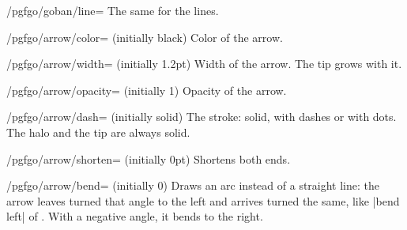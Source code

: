 \begin{key}{/pgfgo/goban/line=}
	The same for the lines.
\end{key}

\begin{key}{/pgfgo/arrow/color= (initially black)}
	Color of the arrow.
\end{key}

\begin{key}{/pgfgo/arrow/width= (initially 1.2pt)}
	Width of the arrow. The tip grows with it.
\end{key}

\begin{key}{/pgfgo/arrow/opacity= (initially 1)}
	Opacity of the arrow.

	\begin{codeexample}[]
		\begin{goban}[5]
		\end{goban}
	\end{codeexample}
\end{key}

\begin{key}{/pgfgo/arrow/dash= (initially solid)}
	The stroke: solid, with dashes or with dots. The halo and the tip are always solid.
\end{key}

\begin{key}{/pgfgo/arrow/shorten= (initially 0pt)}
	Shortens both ends.

	\begin{codeexample}[]
		\begin{goban}[5]
		\end{goban}
	\end{codeexample}
\end{key}

\begin{key}{/pgfgo/arrow/bend= (initially 0)}
	Draws an arc instead of a straight line: the arrow leaves turned that angle to the left and arrives turned the same, like |bend left| of \tikzname. With a negative angle, it bends to the right.

	\begin{codeexample}[]
		\begin{goban}[5]
		\end{goban}
	\end{codeexample}
\end{key}

